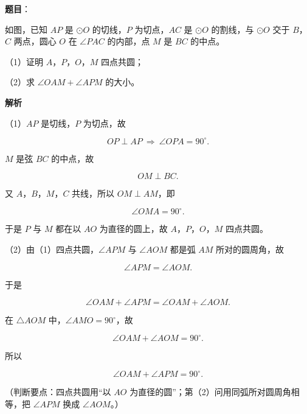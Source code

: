 \begin{answer}

\textbf{题目}：

如图，已知 $AP$ 是 $\odot O$ 的切线，$P$ 为切点，$AC$ 是 $\odot O$ 的割线，与 $\odot O$ 交于 $B$，$C$ 两点，圆心 $O$ 在 $\angle PAC$ 的内部，点 $M$ 是 $BC$ 的中点。

（1）证明 $A$，$P$，$O$，$M$ 四点共圆；

（2）求 $\angle OAM+\angle APM$ 的大小。
\nopagebreak[4]
\begin{center}\end{center}
\nopagebreak[4]
\textbf{解析}

（1）$AP$ 是切线，$P$ 为切点，故

\nopagebreak[4]
\[OP\perp AP\ \Rightarrow\ \angle OPA=90^\circ.\]

$M$ 是弦 $BC$ 的中点，故

\nopagebreak[4]
\[OM\perp BC.\]

又 $A$，$B$，$M$，$C$ 共线，所以 $OM\perp AM$，即

\nopagebreak[4]
\[\angle OMA=90^\circ.\]

于是 $P$ 与 $M$ 都在以 $AO$ 为直径的圆上，故 $A$，$P$，$O$，$M$ 四点共圆。

（2）由（1）四点共圆，$\angle APM$ 与 $\angle AOM$ 都是弧 $AM$ 所对的圆周角，故

\nopagebreak[4]
\[\angle APM=\angle AOM.\]

于是

\nopagebreak[4]
\[\angle OAM+\angle APM=\angle OAM+\angle AOM.\]

在 $\triangle AOM$ 中，$\angle AMO=90^\circ$，故

\nopagebreak[4]
\[\angle OAM+\angle AOM=90^\circ.\]

所以

\nopagebreak[4]
\[\angle OAM+\angle APM=90^\circ.\]

（判断要点：四点共圆用“以 $AO$ 为直径的圆”；第（2）问用同弧所对圆周角相等，把 $\angle APM$ 换成 $\angle AOM$。）


\end{answer}
